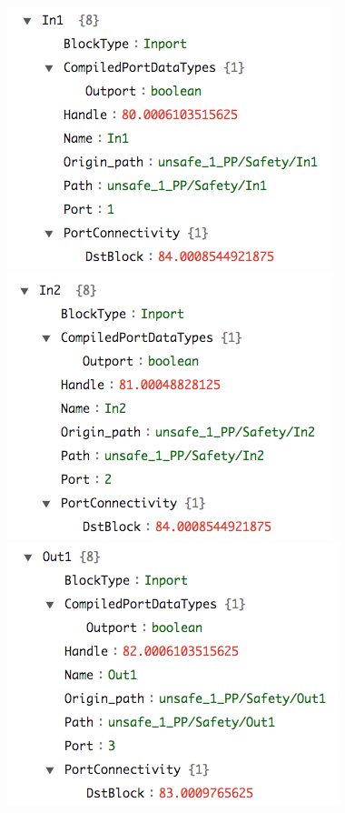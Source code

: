 \documentclass{article}
\begin{document}
\begin{figure}[h]
\begin{center}
  \includegraphics[scale=0.4]{figures/safety1}
    \includegraphics[scale=0.4]{figures/safety2}
  \includegraphics[scale=0.4]{figures/safety4}     

\end{center}
\end{figure}
\end{document}
